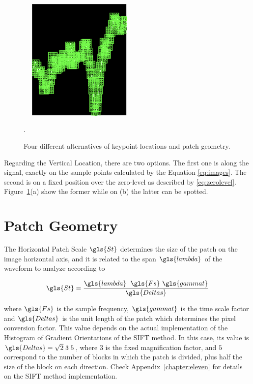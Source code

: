 \begin{figure}[h!]
{\includegraphics[width=6cm, height=6cm]{images/SignalWithFullDescriptors2.png}}
\caption[Keypoint Locations]{Four different alternatives of keypoint locations and patch geometry.}.
\label{fig:keypointlocations}
\end{figure}

Regarding the Vertical Location, there are two options.  The first one is along the signal, exactly on the sample points calculated by the Equation \ref{eq:images}.  The second is on a fixed position over the zero-level as described by \ref{eq:zerolevel}.  Figure~\ref{fig:keypointlocations}(a) show the former while on (b) the latter can be spotted.

\section{Patch Geometry}
\label{patchgeometry}


The Horizontal Patch Scale $\gls{St}$ determines the size of the patch on the image horizontal axis, and it is related to the span $\gls{lambda}$ of the waveform to analyze according to

\begin{equation}
\gls{St} = \frac{ \gls{lambda} \;  \  \gls{Fs} \ \gls{gammat} }{\gls{Deltas}}
\label{eq:horizontalpatchscale}
\end{equation}

\noindent where $\gls{Fs}$ is the sample frequency, $\gls{gammat}$ is the time scale factor and $\gls{Deltas}$ is the unit length of the patch which determines the pixel conversion factor.  This value depends on the actual implementation of the Histogram of Gradient Orientations of the SIFT method. In this case, its value is $\gls{Deltas} = \sqrt{2} \; 3 \; 5$, where $3$ is the fixed magnification factor, and $5$ correspond to the number of blocks in which the patch is divided, plus half the size of the block on each direction.  Check Appendix~\ref{chapter:eleven} for details on the SIFT method implementation.


